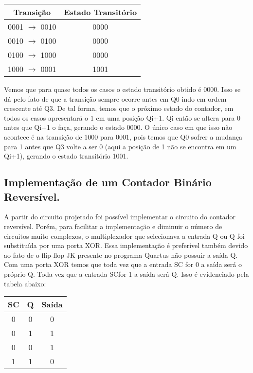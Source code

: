 \documentclass[12pt]{article}
\begin{document}
		\begin{table}[H]
			\centering
			\begin{tabular}{|c|c|}
				\cline{1-2}
				\multicolumn{1}{|c|}{Transição} & \multicolumn{1}{|c|}{Estado Transitório}\\
				\hline
				0001 $\rightarrow $ 0010  & 0000  \\
				\hline
				0010 $\rightarrow $ 0100  & 0000 \\
				\hline
				0100 $\rightarrow $ 1000  & 0000 \\
				\hline
				1000 $\rightarrow $ 0001  & 1001  \\
				\hline
			\end{tabular}
		\end{table}
	
	Vemos que para quase todos os casos o estado transitório obtido é 0000. Isso se dá pelo fato de que a transição sempre ocorre antes em Q0 indo em ordem crescente até Q3. De tal forma, temos que o próximo estado do contador, em todos os casos apresentará o 1 em uma posição Qi+1. Qi então se altera para 0 antes que Qi+1 o faça, gerando o estado 0000. O único caso em que isso não acontece é na transição de 1000 para 0001, pois temos que Q0 sofrer a mudança para 1 antes que Q3 volte a ser 0 (aqui a posição de 1 não se encontra em um Qi+1), gerando o estado transitório 1001. 
	
	

	\subsection{Implementação de um Contador Binário Reversível.}
	
	A partir do circuito projetado foi possível implementar o circuito do contador reversível. Porém, para facilitar a implementação e diminuir o número de circuitos muito complexos, o multiplexador que selecionava a entrada Q ou Q foi substituída por uma porta XOR. Essa implementação é preferível também devido ao fato de o flip-flop JK presente no programa Quartus não possuir a saída Q. Com uma porta XOR temos que toda vez que a entrada SC for 0 a saída será o próprio Q. Toda vez que a entrada SCfor 1 a saída será Q. Isso é evidenciado pela tabela abaixo:
	
	\begin{table}[H]
		\centering
		\begin{tabular}{|c|c|c|}
			\cline{1-3}
			\multicolumn{1}{|c|}{SC} & \multicolumn{1}{|c|}{Q} &
			\multicolumn{1}{|c|}{Saída}\\
			\hline
			0 & 0 & 0 \\
			\hline
			0 & 1 & 1 \\
			\hline
			0 & 0 & 1 \\
			\hline
			1 & 1 & 0 \\
			\hline
		\end{tabular}
	\end{table}
	
\end{document}
